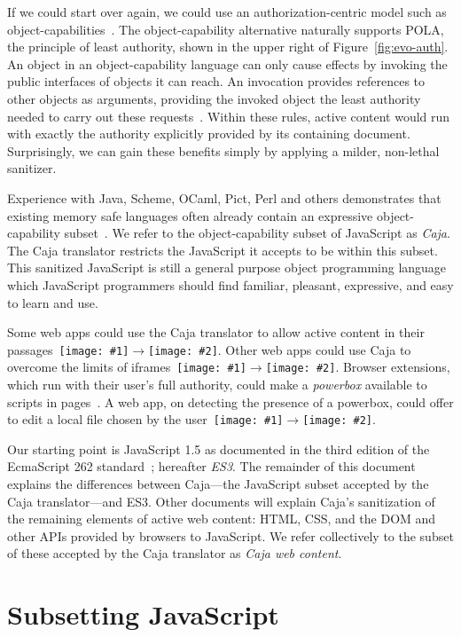 \documentclass[letterpaper,twocolumn,10pt]{article}
\newcommand{\qq}[2]{{\texttt{[image: \#1]}}$\rightarrow${\texttt{[image: \#2]}}}
\begin{document}
If we could start over again, we could use an authorization-centric model 
such as object-capabilities~\cite{DVH}. The object-capability alternative 
naturally supports POLA, the principle of least authority, shown in the upper 
right of Figure~\ref{fig:evo-auth}. An object in an object-capability 
language can only cause effects by invoking the public interfaces of objects 
it can reach. An invocation provides references to other objects as 
arguments, providing the invoked object the least authority needed to carry 
out these requests~\cite{RobustComposition}. Within these rules, active 
content would run with exactly the authority explicitly provided by its 
containing document. Surprisingly, we can gain these benefits simply by 
applying a milder, non-lethal sanitizer.

Experience with Java, Scheme, OCaml, Pict, Perl and others demonstrates that 
existing memory safe languages often already contain an expressive 
object-capability subset~\cite[respectively]{joe-e, rees96security, emily, 
backwater, caperl}. We refer to the object-capability subset of JavaScript as 
\emph{Caja}. The Caja translator restricts the JavaScript it accepts to be 
within this subset. This sanitized JavaScript is still a general purpose 
object programming language which JavaScript programmers should find 
familiar, pleasant, expressive, and easy to learn and use.

Some web apps could use the Caja translator to allow active content in their 
passages~\qq{1}{5}. Other web apps could use Caja to overcome the limits of 
iframes~\qq{3}{5}. Browser extensions, which run with their user's full 
authority, could make a \emph{powerbox} available to scripts in 
pages~\cite{darpareview, stiegler:polaris, seaborn:plash, bitfrost}. A web 
app, on detecting the presence of a powerbox, could offer to edit a local 
file chosen by the user~\qq{4}{6}.

Our starting point is JavaScript 1.5 as documented in the third edition of 
the EcmaScript 262 standard~\cite{ECMA-262}; hereafter \emph{ES3}. The 
remainder of this document explains the differences between Caja---the 
JavaScript subset accepted by the Caja translator---and ES3. Other documents 
will explain Caja's sanitization of the remaining elements of active web 
content: HTML, CSS, and the DOM and other APIs provided by browsers to 
JavaScript. We refer collectively to the subset of these accepted by the 
Caja translator as \emph{Caja web content}.


\section{Subsetting JavaScript}
\label{sec:subset}
\end{document}
